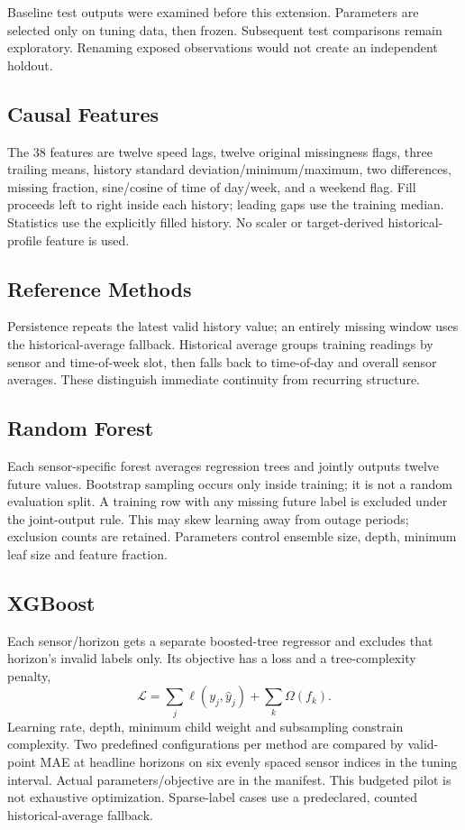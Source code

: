 \documentclass[conference]{IEEEtran}
\begin{document}
Baseline test outputs were examined before this extension. Parameters are selected only on tuning data, then frozen. Subsequent test comparisons remain exploratory. Renaming exposed observations would not create an independent holdout.

\subsection{Causal Features}
The 38 features are twelve speed lags, twelve original missingness flags, three trailing means, history standard deviation/minimum/maximum, two differences, missing fraction, sine/cosine of time of day/week, and a weekend flag. Fill proceeds left to right inside each history; leading gaps use the training median. Statistics use the explicitly filled history. No scaler or target-derived historical-profile feature is used.

\subsection{Reference Methods}
Persistence repeats the latest valid history value; an entirely missing window uses the historical-average fallback. Historical average groups training readings by sensor and time-of-week slot, then falls back to time-of-day and overall sensor averages. These distinguish immediate continuity from recurring structure.

\subsection{Random Forest}
Each sensor-specific forest averages regression trees and jointly outputs twelve future values. Bootstrap sampling occurs only inside training; it is not a random evaluation split. A training row with any missing future label is excluded under the joint-output rule. This may skew learning away from outage periods; exclusion counts are retained. Parameters control ensemble size, depth, minimum leaf size and feature fraction.

\subsection{XGBoost}
Each sensor/horizon gets a separate boosted-tree regressor and excludes that horizon's invalid labels only. Its objective has a loss and a tree-complexity penalty,
\begin{equation}
\mathcal L=\sum_j\ell(y_j,\hat y_j)+\sum_k\Omega(f_k).
\end{equation}
Learning rate, depth, minimum child weight and subsampling constrain complexity. Two predefined configurations per method are compared by valid-point MAE at headline horizons on six evenly spaced sensor indices in the tuning interval. Actual parameters/objective are in the manifest. This budgeted pilot is not exhaustive optimization. Sparse-label cases use a predeclared, counted historical-average fallback.
\end{document}

